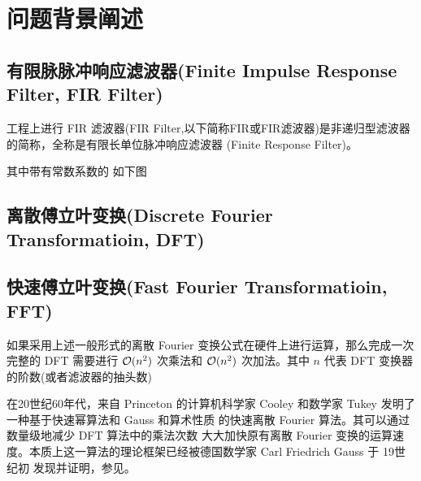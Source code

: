 \section{问题背景阐述}

\subsection{有限脉脉冲响应滤波器(Finite Impulse Response Filter, FIR Filter)}

工程上进行
FIR 滤波器(FIR Filter,以下简称FIR或FIR滤波器)是非递归型滤波器的简称，全称是有限长单位脉冲响应滤波器
(Finite Response Filter)。

其中带有常数系数的
如下图




\subsection{离散傅立叶变换(Discrete Fourier Transformatioin, DFT)}


\subsection{快速傅立叶变换(Fast Fourier Transformatioin, FFT)}

如果采用上述一般形式的离散 Fourier 变换公式在硬件上进行运算，那么完成一次完整的 DFT 需要进行
$\mathcal{O} (n^2)$ 次乘法和 $\mathcal{O}(n^2)$ 次加法。其中 $n$ 代表 DFT 变换器的阶数(或者滤波器的抽头数)

在20世纪60年代，来自 Princeton 的计算机科学家 Cooley 和数学家 Tukey 发明了一种基于快速幂算法和 Gauss 和算术性质
的快速离散 Fourier 算法。其可以通过数量级地减少 DFT 算法中的乘法次数
大大加快原有离散 Fourier 变换的运算速度。本质上这一算法的理论框架已经被德国数学家 Carl Friedrich Gauss 于 19世纪初
发现并证明，参见。
